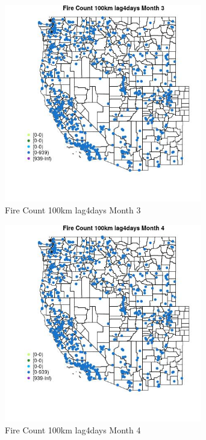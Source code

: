 \begin{figure} 
\centering  
\includegraphics[width=0.77\textwidth]{Code_Outputs/Report_ML_input_PM25_Step4_part_e_de_duplicated_aves_compiled_2019-05-21wNAs_MapObsMo3Fire_Count_100km_lag4days.jpg} 
\caption{\label{fig:Report_ML_input_PM25_Step4_part_e_de_duplicated_aves_compiled_2019-05-21wNAsMapObsMo3Fire_Count_100km_lag4days}Fire Count 100km lag4days Month 3} 
\end{figure} 
 

\begin{figure} 
\centering  
\includegraphics[width=0.77\textwidth]{Code_Outputs/Report_ML_input_PM25_Step4_part_e_de_duplicated_aves_compiled_2019-05-21wNAs_MapObsMo4Fire_Count_100km_lag4days.jpg} 
\caption{\label{fig:Report_ML_input_PM25_Step4_part_e_de_duplicated_aves_compiled_2019-05-21wNAsMapObsMo4Fire_Count_100km_lag4days}Fire Count 100km lag4days Month 4} 
\end{figure} 
 


